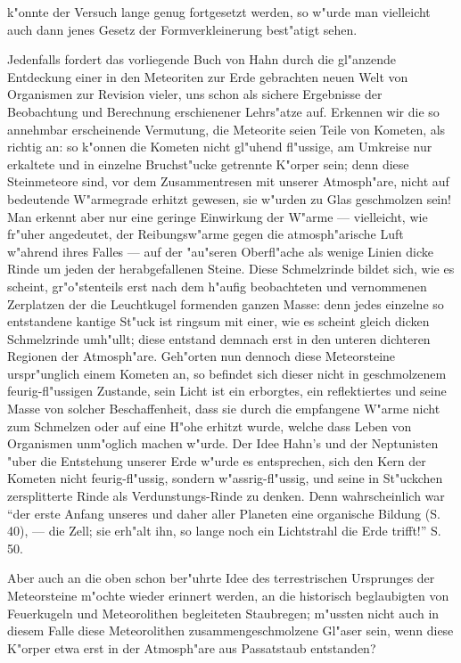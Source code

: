 \documentclass[a4paper, 11pt, oneside]{article}
\begin{document}
k"onnte der Versuch lange genug fortgesetzt werden, so w"urde man vielleicht auch dann jenes Gesetz der Formverkleinerung best"atigt sehen.

Jedenfalls fordert das vorliegende Buch von Hahn durch die gl"anzende Entdeckung einer in den Meteoriten zur Erde gebrachten neuen Welt von Organismen zur Revision vieler, uns schon als sichere Ergebnisse der Beobachtung und Berechnung erschienener Lehrs"atze auf. Erkennen wir die so annehmbar erscheinende Vermutung, die Meteorite seien Teile von Kometen, als richtig an: so k"onnen die Kometen nicht gl"uhend fl"ussige, am Umkreise nur erkaltete und in einzelne Bruchst"ucke getrennte K"orper sein; denn diese Steinmeteore sind, vor dem Zusammentresen mit unserer Atmosph"are, nicht auf bedeutende W"armegrade erhitzt gewesen, sie w"urden zu Glas geschmolzen sein! Man erkennt aber nur eine geringe Einwirkung der W"arme --- vielleicht, wie fr"uher angedeutet, der Reibungsw"arme gegen die atmosph"arische Luft w"ahrend ihres Falles --- auf der "au"seren Oberfl"ache als wenige Linien dicke Rinde um jeden der herabgefallenen Steine. Diese Schmelzrinde bildet sich, wie es scheint, gr"o"stenteils erst nach dem h"aufig beobachteten und vernommenen Zerplatzen der die Leuchtkugel formenden ganzen Masse: denn jedes einzelne so entstandene kantige St"uck ist ringsum mit einer, wie es scheint gleich dicken Schmelzrinde umh"ullt; diese entstand demnach erst in den unteren dichteren Regionen der Atmosph"are. Geh"orten nun dennoch diese Meteorsteine urspr"unglich einem Kometen an, so befindet sich dieser nicht in geschmolzenem feurig-fl"ussigen Zustande, sein Licht ist ein erborgtes, ein reflektiertes und seine Masse von solcher Beschaffenheit, dass sie durch die empfangene W"arme nicht zum Schmelzen oder auf eine H"ohe erhitzt wurde, welche dass Leben von Organismen unm"oglich machen w"urde. Der Idee Hahn's und der Neptunisten "uber die Entstehung unserer Erde w"urde es entsprechen, sich den Kern der Kometen nicht feurig-fl"ussig, sondern w"assrig-fl"ussig, und seine in St"uckchen zersplitterte Rinde als Verdunstungs-Rinde zu denken. Denn wahrscheinlich war "`der erste Anfang unseres und daher aller Planeten eine organische Bildung (S. 40), --- die Zell; sie erh"alt ihn, so lange noch ein Lichtstrahl die Erde trifft!"' S. 50.

Aber auch an die oben schon ber"uhrte Idee des terrestrischen Ursprunges der Meteorsteine m"ochte wieder erinnert werden, an die historisch beglaubigten von Feuerkugeln und Meteorolithen begleiteten Staubregen; m"ussten nicht auch in diesem Falle diese Meteorolithen zusammengeschmolzene Gl"aser sein, wenn diese K"orper etwa erst in der Atmosph"are aus Passatstaub entstanden?
\end{document}
